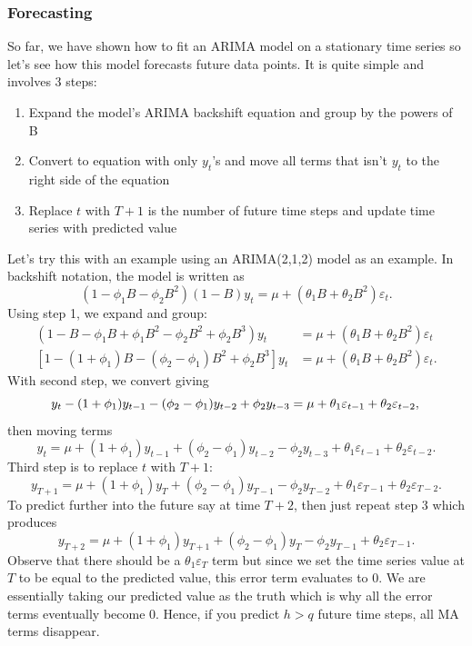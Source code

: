 \documentclass{article}
\begin{document}
  \subsubsection{Forecasting}
  So far, we have shown how to fit an ARIMA model on a stationary time series so let's see how this model forecasts future data points. It is quite simple and involves 3 steps:
  \begin{enumerate}
    \item Expand the model's ARIMA backshift equation and group by the powers of B
    \item Convert to equation with only $y_t$'s and move all terms that isn't $y_t$ to the right side of the equation
    \item Replace $t$ with $T+1$ is the number of future time steps and update time series with predicted value
  \end{enumerate}
  Let's try this with an example using an ARIMA(2,1,2) model as an example. In backshift notation, the model is written as
  \begin{equation*}
    (1 - \phi_1B - \phi_2B^2)(1-B)y_t = \mu + (\theta_1B + \theta_2B^2)\varepsilon_t.
  \end{equation*}
  Using step 1, we expand and group:
  \begin{align*}
    (1 - B - \phi_1B + \phi_1B^2 - \phi_2B^2 + \phi_2B^3)y_t &= \mu + (\theta_1B + \theta_2B^2)\varepsilon_t\\
    [1 - (1 + \phi_1)B - (\phi_2 - \phi_1)B^2 + \phi_2B^3]y_t &= \mu + (\theta_1B + \theta_2B^2)\varepsilon_t.
  \end{align*}
  With second step, we convert giving
  \begin{equation*}
    y_t - (1 + \phi_1)y_{t-1} - (\phi_2 - \phi_1)y_{t-2} + \phi_2y_{t-3} = \mu + \theta_1\varepsilon_{t-1} + \theta_2\varepsilon_{t-2},\\
  \end{equation*}
  then moving terms
  \begin{equation*}
    y_t = \mu + (1 + \phi_1)y_{t-1} + (\phi_2 - \phi_1)y_{t-2} - \phi_2y_{t-3} + \theta_1\varepsilon_{t-1} + \theta_2\varepsilon_{t-2}.
  \end{equation*}
  Third step is to replace $t$ with $T+1$:
  \begin{equation*}
    y_{T+1} = \mu + (1 + \phi_1)y_{T} + (\phi_2 - \phi_1)y_{T-1} - \phi_2y_{T-2} + \theta_1\varepsilon_{T-1} + \theta_2\varepsilon_{T-2}.
  \end{equation*}
  To predict further into the future say at time $T+2$, then just repeat step 3 which produces
  \begin{equation*}
    y_{T+2} = \mu + (1 + \phi_1)y_{T+1} + (\phi_2 - \phi_1)y_{T} - \phi_2y_{T-1} + \theta_2\varepsilon_{T-1}.
  \end{equation*}
  Observe that there should be a $\theta_1\varepsilon_{T}$ term but since we set the time series value at $T$ to be equal to the predicted value, this error term evaluates to 0. We are essentially taking our predicted value as the truth which is why all the error terms eventually become 0. Hence, if you predict $h > q$ future time steps, all MA terms disappear. 
  
\end{document}
